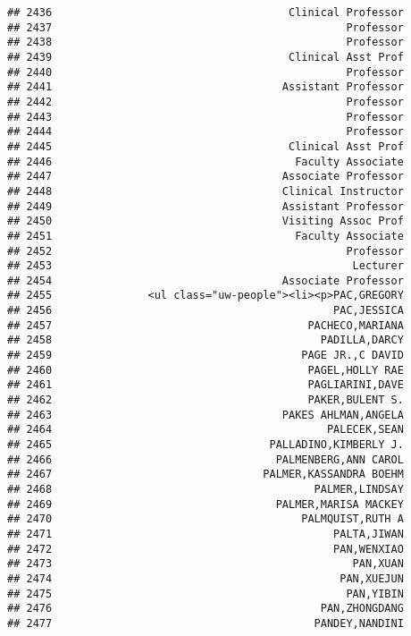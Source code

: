 \documentclass[
]{article}
\begin{document}
\begin{verbatim}
## 2436                                     Clinical Professor
## 2437                                              Professor
## 2438                                              Professor
## 2439                                     Clinical Asst Prof
## 2440                                              Professor
## 2441                                    Assistant Professor
## 2442                                              Professor
## 2443                                              Professor
## 2444                                              Professor
## 2445                                     Clinical Asst Prof
## 2446                                      Faculty Associate
## 2447                                    Associate Professor
## 2448                                    Clinical Instructor
## 2449                                    Assistant Professor
## 2450                                    Visiting Assoc Prof
## 2451                                      Faculty Associate
## 2452                                              Professor
## 2453                                               Lecturer
## 2454                                    Associate Professor
## 2455               <ul class="uw-people"><li><p>PAC,GREGORY
## 2456                                            PAC,JESSICA
## 2457                                        PACHECO,MARIANA
## 2458                                          PADILLA,DARCY
## 2459                                       PAGE JR.,C DAVID
## 2460                                        PAGEL,HOLLY RAE
## 2461                                        PAGLIARINI,DAVE
## 2462                                        PAKER,BULENT S.
## 2463                                    PAKES AHLMAN,ANGELA
## 2464                                           PALECEK,SEAN
## 2465                                  PALLADINO,KIMBERLY J.
## 2466                                   PALMENBERG,ANN CAROL
## 2467                                 PALMER,KASSANDRA BOEHM
## 2468                                         PALMER,LINDSAY
## 2469                                   PALMER,MARISA MACKEY
## 2470                                       PALMQUIST,RUTH A
## 2471                                            PALTA,JIWAN
## 2472                                            PAN,WENXIAO
## 2473                                               PAN,XUAN
## 2474                                             PAN,XUEJUN
## 2475                                              PAN,YIBIN
## 2476                                          PAN,ZHONGDANG
## 2477                                         PANDEY,NANDINI

\end{verbatim}
\end{document}

